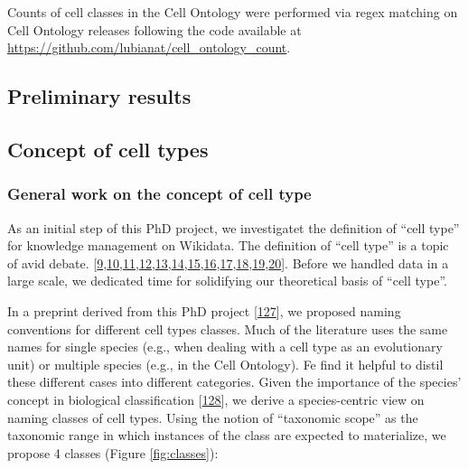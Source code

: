 Counts of cell classes in the Cell Ontology were performed via regex matching on Cell Ontology releases following the code available at \url{https://github.com/lubianat/cell_ontology_count}.

\hypertarget{preliminary-results}{%
\subsection{Preliminary results}\label{preliminary-results}}

\hypertarget{concept-of-cell-types}{%
\subsection{Concept of cell types}\label{concept-of-cell-types}}

\hypertarget{general-work-on-the-concept-of-cell-type}{%
\subsubsection{General work on the concept of cell type}\label{general-work-on-the-concept-of-cell-type}}

As an initial step of this PhD project, we investigatet the definition of ``cell type'' for knowledge management on Wikidata.
The definition of ``cell type'' is a topic of avid debate. {[}\protect\hyperlink{ref-paKiKTRS}{9},\protect\hyperlink{ref-sWv3okaH}{10},\protect\hyperlink{ref-19yYJWEkz}{11},\protect\hyperlink{ref-BlxFp1v3}{12},\protect\hyperlink{ref-eOUB1Bmj}{13},\protect\hyperlink{ref-TupzTvtA}{14},\protect\hyperlink{ref-w0Woz7JE}{15},\protect\hyperlink{ref-srfuRMe}{16},\protect\hyperlink{ref-1GXQByEaQ}{17},\protect\hyperlink{ref-k0Pe9YOB}{18},\protect\hyperlink{ref-pNGap1Du}{19},\protect\hyperlink{ref-MoaYZAA0}{20}{]}.
Before we handled data in a large scale, we dedicated time for solidifying our theoretical basis of ``cell type''.

In a preprint derived from this PhD project {[}\protect\hyperlink{ref-uCE45Jh8}{127}{]}, we proposed naming conventions for different cell types classes.
Much of the literature uses the same names for single species (e.g., when dealing with a cell type as an evolutionary unit) or multiple species (e.g., in the Cell Ontology).
Fe find it helpful to distil these different cases into different categories.
Given the importance of the species' concept in biological classification {[}\protect\hyperlink{ref-AHGRV6KQ}{128}{]}, we derive a species-centric view on naming classes of cell types.
Using the notion of ``taxonomic scope'' as the taxonomic range in which instances of the class are expected to materialize, we propose 4 classes (Figure \ref{fig:classes}):

